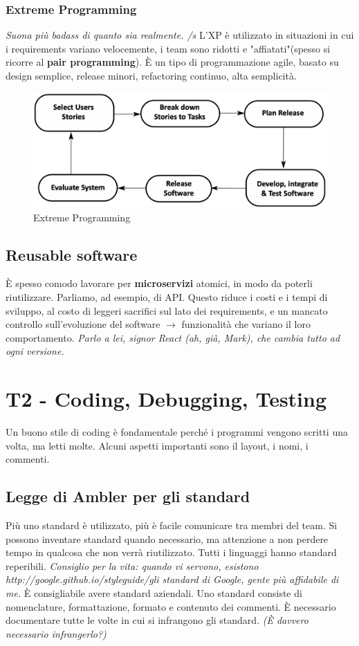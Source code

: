 \documentclass[11pt]{article}
\begin{document}
\subsubsection{Extreme Programming}
\textit{Suona più badass di quanto sia realmente. /s} L'XP è utilizzato in situazioni in cui i requirements variano velocemente, i team sono ridotti e "affiatati"(spesso si ricorre al \textbf{pair programming}). È un tipo di programmazione agile, basato su design semplice, release minori, refactoring continuo, alta semplicità. 
\begin{figure}[H]
    \centering
    \includegraphics[width=\linewidth]{res/teoria/ExtremeProgramming.png}
    \caption{Extreme Programming}
\end{figure}
\subsection{Reusable software}
È spesso comodo lavorare per \textbf{microservizi} atomici, in modo da poterli riutilizzare. Parliamo, ad esempio, di API. Questo riduce i costi e i tempi di sviluppo, al costo di leggeri sacrifici sul lato dei requirements, e un mancato controllo sull'evoluzione del software $\rightarrow$ funzionalità che variano il loro comportamento. \textit{Parlo a lei, signor React (ah, già, Mark), che cambia tutto ad ogni versione.} 

\section{T2 - Coding, Debugging, Testing} 
Un buono stile di coding è fondamentale perché i programmi vengono scritti una volta, ma letti molte. Alcuni aspetti importanti sono il layout, i nomi, i commenti. 
\subsection{Legge di Ambler per gli standard}
Più uno standard è utilizzato, più è facile comunicare tra membri del team. Si possono inventare standard quando necessario, ma attenzione a non perdere tempo in qualcosa che non verrà riutilizzato. 
Tutti i linguaggi hanno standard reperibili. \textit{Consiglio per la vita: quando vi servono, esistono http://google.github.io/styleguide/gli standard di Google, gente più affidabile di me.} È consigliabile avere standard aziendali. Uno standard consiste di nomenclature, formattazione, formato e contenuto dei commenti. È necessario documentare tutte le volte in cui si infrangono gli standard. \textit{(È davvero necessario infrangerlo?)}
\end{document}
